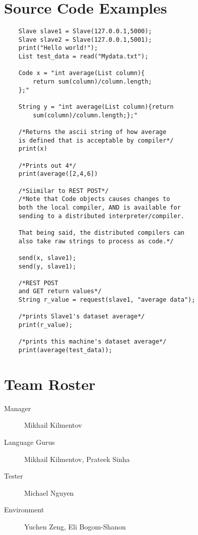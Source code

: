 \documentclass[10pt]{article}
\begin{document}
\section{Source Code Examples}
	\begin{lstlisting}
    Slave slave1 = Slave(127.0.0.1,5000);
    Slave slave2 = Slave(127.0.0.1,5001);    
    print("Hello world!");
    List test_data = read("Mydata.txt");
    
    Code x = "int average(List column){
    	return sum(column)/column.length;
    };"
   
    String y = "int average(List column){return
        sum(column)/column.length;};"

    /*Returns the ascii string of how average  
    is defined that is acceptable by compiler*/
    print(x) 
    
    /*Prints out 4*/
    print(average([2,4,6])

    /*Siimilar to REST POST*/
    /*Note that Code objects causes changes to
    both the local compiler, AND is available for
    sending to a distributed interpreter/compiler.
    
    That being said, the distributed compilers can
    also take raw strings to process as code.*/

    send(x, slave1);
    send(y, slave1);

    /*REST POST
    and GET return values*/
    String r_value = request(slave1, "average data"); 
    
    /*prints Slave1's dataset average*/
    print(r_value); 
   
    /*prints this machine's dataset average*/
    print(average(test_data));

    \end{lstlisting}

\section{Team Roster}
    \begin{description}
        \item[Manager] Mikhail Kilmentov
        \item[Language Gurus] Mikhail Kilmentov, Prateek Sinha
        \item[Tester] Michael Nguyen
        \item[Environment] Yuchen Zeng, Eli Bogom-Shanon
    \end{description}
\end{document}
